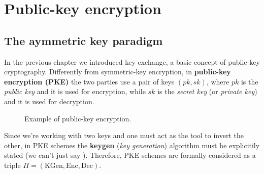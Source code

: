 \documentclass[a4paper, 12pt]{report}
\begin{document}
    \chapter{Public-key encryption}

    \section{The aymmetric key paradigm}

    In the previous chapter we introduced key exchange, a basic concept of public-key cryptography. Differently from symmetric-key encryption, in \textbf{public-key encryption (PKE)} the two parties use a pair of keys $(pk, sk)$, where $pk$ is the \textit{public key} and it is used for encryption, while $sk$ is the \textit{secret key} (or \textit{private key}) and it is used for decryption.  

    \begin{figure}[H]
        \centering


        \caption{Example of public-key encryption.}
    \end{figure}

    Since we're working with two keys and one must act as the tool to invert the other, in PKE schemes the \textbf{keygen} (\textit{key generation}) algorithm must be explicitily stated (we can't just say ). Therefore, PKE schemes are formally considered as a triple $\Pi = (\mathrm{KGen}, \mathrm{Enc}, \mathrm{Dec})$. 
\end{document}
